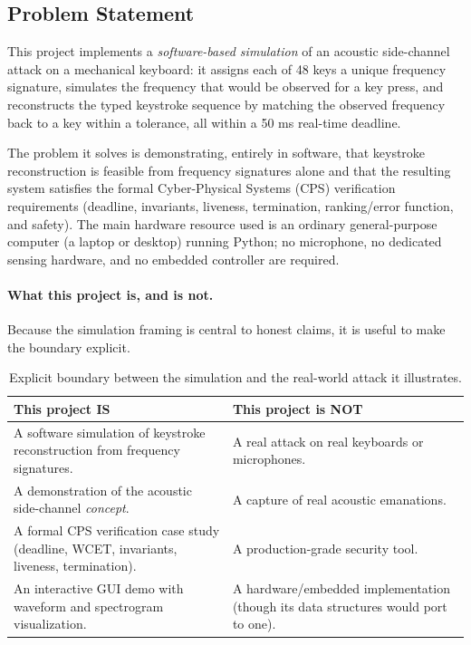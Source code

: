 \documentclass[11pt,a4paper]{article}
\begin{document}
\subsection{Problem Statement}

This project implements a \emph{software-based simulation} of an acoustic
side-channel attack on a mechanical keyboard: it assigns each of 48 keys a
unique frequency signature, simulates the frequency that would be observed for
a key press, and reconstructs the typed keystroke sequence by matching the
observed frequency back to a key within a tolerance, all within a 50 ms
real-time deadline.

\noindent
The problem it solves is demonstrating, entirely in software, that keystroke
reconstruction is feasible from frequency signatures alone and that the
resulting system satisfies the formal Cyber-Physical Systems (CPS) verification
requirements (deadline, invariants, liveness, termination, ranking/error
function, and safety). The main hardware resource used is an ordinary
general-purpose computer (a laptop or desktop) running Python; no microphone,
no dedicated sensing hardware, and no embedded controller are required.

\paragraph{What this project is, and is not.}
Because the simulation framing is central to honest claims, it is useful to make
the boundary explicit.

\begin{table}[H]
    \centering
    \begin{tabular}{@{}p{7cm}p{7cm}@{}}
        \toprule
        \textbf{This project IS} &
        \textbf{This project is NOT} \\
        \midrule
        A software simulation of keystroke reconstruction from frequency
        signatures. &
        A real attack on real keyboards or microphones. \\
        A demonstration of the acoustic side-channel \emph{concept}. &
        A capture of real acoustic emanations. \\
        A formal CPS verification case study
        (deadline, WCET, invariants, liveness, termination). &
        A production-grade security tool. \\
        An interactive GUI demo with waveform and spectrogram visualization. &
        A hardware/embedded implementation (though its data structures
        would port to one). \\
        \bottomrule
    \end{tabular}
    \caption{Explicit boundary between the simulation and the real-world attack
             it illustrates.}
    \label{tab:isnot}
\end{table}
\end{document}
